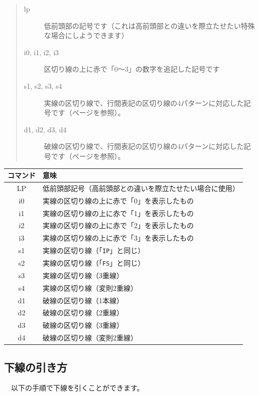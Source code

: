 \begin{quote}
\begin{description}
\item[lp] 低前頭部の記号です（これは高前頭部との違いを際立たせたい特殊な場合にしようできます）
\item[i0, i1, i2, i3] 区切り線の上に赤で「0〜3」の数字を追記した記号です
\item[s1, s2, s3, s4] 実線の区切り線で、行間表記の区切り線の4パターンに対応した記号です（\pageref{SolidLineSample}ページを参照）。
\item[d1, d2, d3, d4] 破線の区切り線で、行間表記の区切り線の4パターンに対応した記号です（\pageref{DashedLineSample}ページを参照）。
\end{description}
\end{quote}

\begin{table}[h]
	\centering
	\begin{tabular}{cl}
	\hline
	コマンド & 意味\\
	\hline
	\hline
	LP & 低前頭部記号（高前頭部との違いを際立たせたい場合に使用）\\
	\hline
	i0 & 実線の区切り線の上に赤で「0」を表示したもの\\
	i1 & 実線の区切り線の上に赤で「1」を表示したもの\\
	i2 & 実線の区切り線の上に赤で「2」を表示したもの\\
	i3 & 実線の区切り線の上に赤で「3」を表示したもの\\
	\hline
	s1 & 実線の区切り線（「\texttt{IP}」と同じ）\\
	s2 & 実線の区切り線（「\texttt{FS}」と同じ）\\
	s3 & 実線の区切り線（3重線）\\
	s4 & 実線の区切り線（変則2重線）\\
	\hline
	d1 & 破線の区切り線（1本線）\\
	d2 & 破線の区切り線（2重線）\\
	d3 & 破線の区切り線（3重線）\\
	d4 & 破線の区切り線（変則2重線）\\
	\hline
	\end{tabular}
\end{table}


\subsection{下線の引き方}

　以下の手順で下線を引くことができます。

